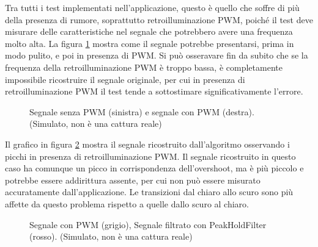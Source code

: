 Tra tutti i test implementati nell'applicazione, questo è quello che soffre di più della presenza di rumore, soprattutto retroilluminazione PWM, poiché il test deve misurare delle caratteristiche nel segnale che potrebbero avere una frequenza molto alta. La figura \ref{fig:pixelOverdriveTest_example1} mostra come il segnale potrebbe presentarsi, prima in modo pulito, e poi in presenza di PWM. Si può osseravare fin da subito che se la frequenza della retroilluminazione PWM è troppo bassa, è completamente impossibile ricostruire il segnale originale, per cui in presenza di retroilluminazione PWM il test tende a sottostimare significativamente l'errore.

\begin{figure}[H]
	\centering
	\caption{Segnale senza PWM (sinistra) e segnale con PWM (destra). (Simulato, non è una cattura reale)}
	\label{fig:pixelOverdriveTest_example1}
\end{figure}

Il grafico in figura \ref{fig:pixelOverdriveTest_example2} mostra il segnale ricostruito dall'algoritmo osservando i picchi in presenza di retroilluminazione PWM. Il segnale ricostruito in questo caso ha comunque un picco in corrispondenza dell'overshoot, ma è più piccolo e potrebbe essere addirittura assente, per cui non può essere misurato accuratamente dall'applicazione. Le transizioni dal chiaro allo scuro sono più affette da questo problema rispetto a quelle dallo scuro al chiaro.

\begin{figure}[H]
	\centering
	\caption{Segnale con PWM (grigio), Segnale filtrato con PeakHoldFilter (rosso). (Simulato, non è una cattura reale)}
	\label{fig:pixelOverdriveTest_example2}
\end{figure}

